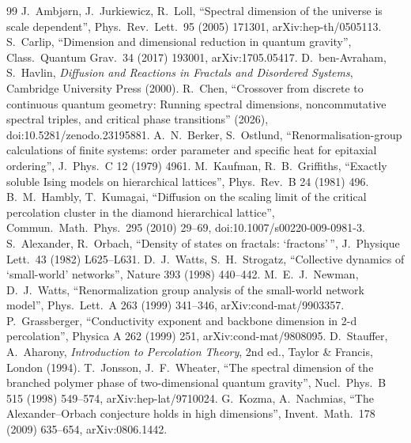 \documentclass[11pt]{article}
\theoremstyle{remark}\newtheorem*{remark}{Remark}
\begin{document}
\begingroup\raggedright
\begin{thebibliography}{99}\small
{} J.~Ambj{\o}rn, J.~Jurkiewicz, R.~Loll, ``Spectral dimension of the universe is scale dependent'', Phys.\ Rev.\ Lett.\ 95 (2005) 171301, arXiv:hep-th/0505113.
 S.~Carlip, ``Dimension and dimensional reduction in quantum gravity'', Class.\ Quantum Grav.\ 34 (2017) 193001, arXiv:1705.05417.
 D.~ben-Avraham, S.~Havlin, \emph{Diffusion and Reactions in Fractals and Disordered Systems}, Cambridge University Press (2000).
 R.~Chen, ``Crossover from discrete to continuous quantum geometry: Running spectral dimensions, noncommutative spectral triples, and critical phase transitions'' (2026), doi:10.5281/zenodo.23195881.
 A.~N.~Berker, S.~Ostlund, ``Renormalisation-group calculations of finite systems: order parameter and specific heat for epitaxial ordering'', J.\ Phys.\ C 12 (1979) 4961.
 M.~Kaufman, R.~B.~Griffiths, ``Exactly soluble Ising models on hierarchical lattices'', Phys.\ Rev.\ B 24 (1981) 496.
 B.~M.~Hambly, T.~Kumagai, ``Diffusion on the scaling limit of the critical percolation cluster in the diamond hierarchical lattice'', Commun.\ Math.\ Phys.\ 295 (2010) 29--69, doi:10.1007/s00220-009-0981-3.
 S.~Alexander, R.~Orbach, ``Density of states on fractals: `fractons'\,'', J.\ Physique Lett.\ 43 (1982) L625--L631.
 D.~J.~Watts, S.~H.~Strogatz, ``Collective dynamics of `small-world' networks'', Nature 393 (1998) 440--442.
 M.~E.~J.~Newman, D.~J.~Watts, ``Renormalization group analysis of the small-world network model'', Phys.\ Lett.\ A 263 (1999) 341--346, arXiv:cond-mat/9903357.
 P.~Grassberger, ``Conductivity exponent and backbone dimension in 2-d percolation'', Physica A 262 (1999) 251, arXiv:cond-mat/9808095.
 D.~Stauffer, A.~Aharony, \emph{Introduction to Percolation Theory}, 2nd ed., Taylor \& Francis, London (1994).
 T.~Jonsson, J.~F.~Wheater, ``The spectral dimension of the branched polymer phase of two-dimensional quantum gravity'', Nucl.\ Phys.\ B 515 (1998) 549--574, arXiv:hep-lat/9710024.
 G.~Kozma, A.~Nachmias, ``The Alexander--Orbach conjecture holds in high dimensions'', Invent.\ Math.\ 178 (2009) 635--654, arXiv:0806.1442.
\end{thebibliography}
\endgroup
\end{document}

